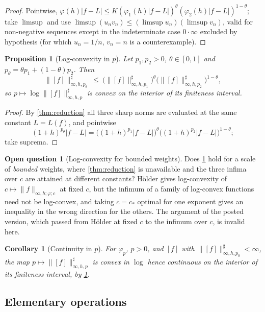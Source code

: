 \documentclass[11pt,a4paper]{article}
\numberwithin{equation}{section}
\theoremstyle{plain}
\newtheorem{proposition}[theorem]{Proposition}
\newtheorem{corollary}[theorem]{Corollary}
\theoremstyle{definition}
\newtheorem{question}[theorem]{Open question}
\theoremstyle{remark}
\begin{document}
\begin{proof}
Pointwise, $\varphi(h)|f-L|\le K(\varphi_1(h)|f-L|)^{\theta}(\varphi_2(h)|f-L|)^{1-\theta}$;
take $\limsup$ and use $\limsup(u_nv_n)\le(\limsup u_n)(\limsup v_n)$, valid for
non-negative sequences except in the indeterminate case $0\cdot\infty$ excluded by
hypothesis (for which $u_n=1/n$, $v_n=n$ is a counterexample).
\end{proof}

\begin{proposition}[Log-convexity in $p$]\label{prop:logconvex}
Let $p_1,p_2>0$, $\theta\in[0,1]$ and $p_\theta=\theta p_1+(1-\theta)p_2$. Then
\[
\|[f]\|^{\sharp}_{\infty,h,p_\theta}\ \le\
\bigl(\|[f]\|^{\sharp}_{\infty,h,p_1}\bigr)^{\theta}
\bigl(\|[f]\|^{\sharp}_{\infty,h,p_2}\bigr)^{1-\theta},
\]
so $p\mapsto\log\|[f]\|^{\sharp}_{\infty,h,p}$ is convex on the interior of its finiteness
interval.
\end{proposition}

\begin{proof}
By \cref{thm:reduction} all three sharp norms are evaluated at the same constant
$L=L(f)$, and pointwise
\[
(1+h)^{p_\theta}|f-L|=\bigl((1+h)^{p_1}|f-L|\bigr)^{\theta}
\bigl((1+h)^{p_2}|f-L|\bigr)^{1-\theta};
\]
take suprema.
\end{proof}

\begin{question}[Log-convexity for bounded weights]\label{q:logconvex}
Does \cref{prop:logconvex} hold for a scale of \emph{bounded} weights, where
\cref{thm:reduction} is unavailable and the three infima over $c$ are attained at
different constants? H\"older gives log-convexity of $c\mapsto\|f\|_{\infty,h;\varphi;c}$
at fixed $c$, but the infimum of a family of log-convex functions need not be log-convex,
and taking $c=c_\ast$ optimal for one exponent gives an inequality in the wrong direction
for the others. The argument of the posted version, which passed from H\"older at fixed $c$
to the infimum over $c$, is invalid here.
\end{question}

\begin{corollary}[Continuity in $p$]\label{cor:cont-p}
For $\varphi_p$, $p>0$, and $[f]$ with $\|[f]\|^{\sharp}_{\infty,h,p_0}<\infty$, the map
$p\mapsto\|[f]\|^{\sharp}_{\infty,h,p}$ is convex in $\log$ hence continuous on the
interior of its finiteness interval, by \cref{prop:logconvex}.
\end{corollary}

\subsection{Elementary operations}
\end{document}
